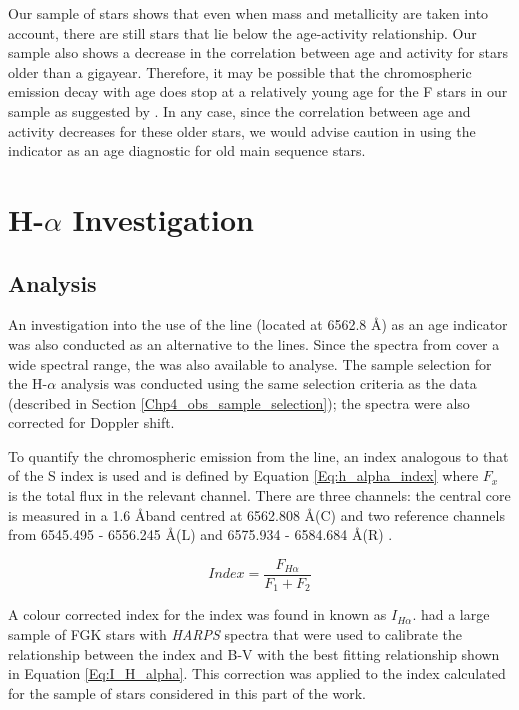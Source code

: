 Our sample of stars shows that even when mass and metallicity are taken into account, there are still stars that lie below the age-activity relationship. Our sample also shows a decrease in the correlation between age and activity for stars older than a gigayear. Therefore, it may be possible that the chromospheric emission decay with age does stop at a relatively young age for the F stars in our sample as suggested by \citet{Pace_2013}. In any case, since the correlation between age and activity decreases for these older stars, we would advise caution in using the \Rprime indicator as an age diagnostic for old main sequence stars.

\section{\texorpdfstring{H-$\alpha$}{H-alpha} Investigation}
\label{Chp4_halpha}
\subsection{Analysis}
An investigation into the use of the \Halpha line (located at 6562.8 \AA) as an age indicator was also conducted as an alternative to the \caII lines. Since the spectra from \citet{Bruntt_etal_2012} cover a wide spectral range, the \Halpha was also available to analyse. The sample selection for the H-$\alpha$ analysis was conducted using the same selection criteria as the \caII data (described in Section \ref{Chp4_obs_sample_selection}); the spectra were also corrected for Doppler shift.

To quantify the chromospheric emission from the \Halpha line, an index analogous to that of the S index is used and is defined by Equation \ref{Eq:h_alpha_index} where $F_{x}$ is the total flux in the relevant channel. There are three channels: the central \Halpha core is measured in a 1.6 \AA \space band centred at 6562.808 \AA \space (C) and two reference channels from 6545.495 - 6556.245 \AA \space (L) and 6575.934 - 6584.684 \AA \space (R) \citep{Gomes_da_Silva_etal_2011}.

\begin{equation}
    Index = \frac{F_{H{\alpha}}}{F_{1}+F_{2}}
    \label{Eq:h_alpha_index}
\end{equation}

A colour corrected index for the \Halpha index was found in \citet{Gomes_da_Silva_etal_2014} known as $I_{H\alpha}$. \citet{Gomes_da_Silva_etal_2014} had a large sample of FGK stars with \textit{HARPS} spectra that were used to calibrate the relationship between the \Halpha index and B-V with the best fitting relationship shown in Equation \ref{Eq:I_H_alpha}. This correction was applied to the \Halpha index calculated for the sample of stars considered in this part of the work.

